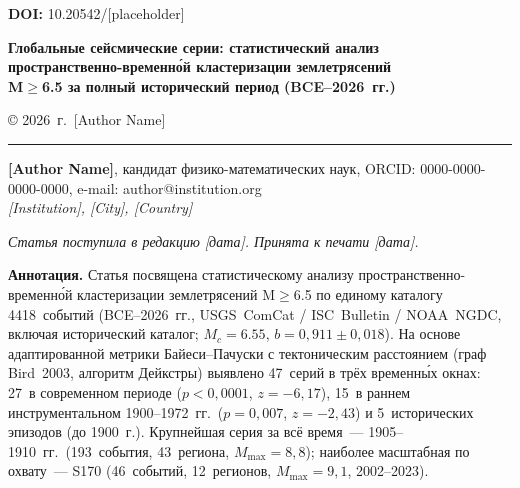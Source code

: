 \documentclass[12pt,a4paper]{article}
\begin{document}
\noindent\textbf{DOI:} 10.20542/[placeholder]

\vspace{0.8cm}

\begin{center}
{\large\bfseries
Глобальные сейсмические серии: статистический анализ\\
пространственно-временн\'{о}й кластеризации землетрясений\\
M$\geq$6.5 за полный исторический период (BCE--2026~гг.)
}
\end{center}

\vspace{0.4cm}
\begin{center}
{\normalsize \copyright{} 2026~г.\ [Author Name]}
\end{center}

\vspace{0.8cm}
\hrule
\vspace{0.5cm}


\noindent\textbf{[Author Name]},
кандидат физико-математических наук,
ORCID: 0000-0000-0000-0000,
e-mail: author@institution.org\\
\textit{[Institution], [City], [Country]}

\vspace{0.4cm}

\noindent\textit{Статья поступила в редакцию [дата].
Принята к печати [дата].}

\vspace{0.6cm}

\noindent\textbf{Аннотация.}
Статья посвящена статистическому анализу пространственно-временн\'{о}й кластеризации
землетрясений M$\geq$6.5 по единому каталогу 4418~событий (BCE--2026~гг., USGS~ComCat /
ISC~Bulletin / NOAA~NGDC, включая исторический каталог; $M_c{=}6.55$, $b{=}0{,}911{\pm}0{,}018$).
На основе адаптированной метрики Байеси--Пачуски с тектоническим расстоянием
(граф Bird~2003, алгоритм Дейкстры) выявлено 47~серий в трёх временны́х окнах:
27~в современном периоде ($p{<}0{,}0001$, $z{=}{-}6{,}17$),
15~в раннем инструментальном 1900--1972~гг.\ ($p{=}0{,}007$, $z{=}{-}2{,}43$)
и 5~исторических эпизодов (до 1900~г.).
Крупнейшая серия за всё время~--- 1905--1910~гг.\ (193~события, 43~региона, $M_{\max}{=}8{,}8$);
наиболее масштабная по охвату~--- S170 (46~событий, 12~регионов,
$M_{\max}{=}9{,}1$, 2002--2023).
\end{document}
